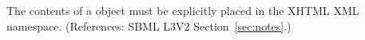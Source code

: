 The contents of a \Notes object must be explicitly placed in the
XHTML XML namespace.  (References: SBML L3V2 Section~\ref{sec:notes}.)

